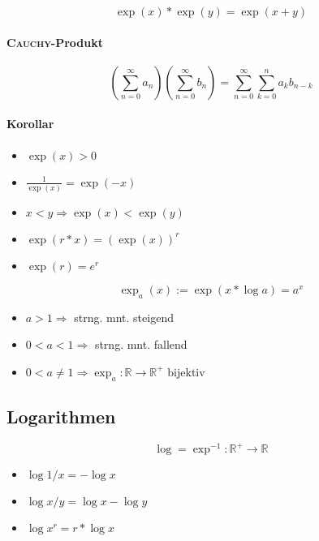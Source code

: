 \begin{mzImportant}
  $$\exp(x) * \exp(y) = \exp(x + y)$$
\end{mzImportant}

\paragraph{\textsc{Cauchy}-Produkt}

\begin{mzImportant}
  $$(\sum_{n = 0}^\infty a_n)(\sum_{n = 0}^\infty b_n) = \sum_{n = 0}^\infty \sum_{k = 0}^n a_k b_{n - k}$$
\end{mzImportant}

\paragraph{Korollar}

\begin{itemize}
  \item $\exp (x) > 0$
  \item $\frac{1}{\exp (x)} = \exp (-x)$
  \item $x < y \Rightarrow \exp (x) < \exp (y)$
  \item $\exp(r * x) = (\exp (x))^r$
  \item $\exp(r) = e^r$
\end{itemize}

$$\exp_a (x) := \exp(x * \log a) = a^x$$

\begin{itemize}
  \item $a > 1 \Rightarrow$ strng. mnt. steigend
  \item $0 < a < 1 \Rightarrow$ strng. mnt. fallend
  \item $0 < a \neq 1 \Rightarrow \exp_a: \mathbb{R} \rightarrow \mathbb{R}^+$ bijektiv
\end{itemize}

\subsection{Logarithmen}

$$\log = \exp^{-1}: \mathbb{R}^+ \rightarrow \mathbb{R}$$

\begin{itemize}
  \item $\log 1/x = - \log x$
  \item $\log x/y = \log x - \log y$
  \item $\log x^r = r * \log x$
\end{itemize}

